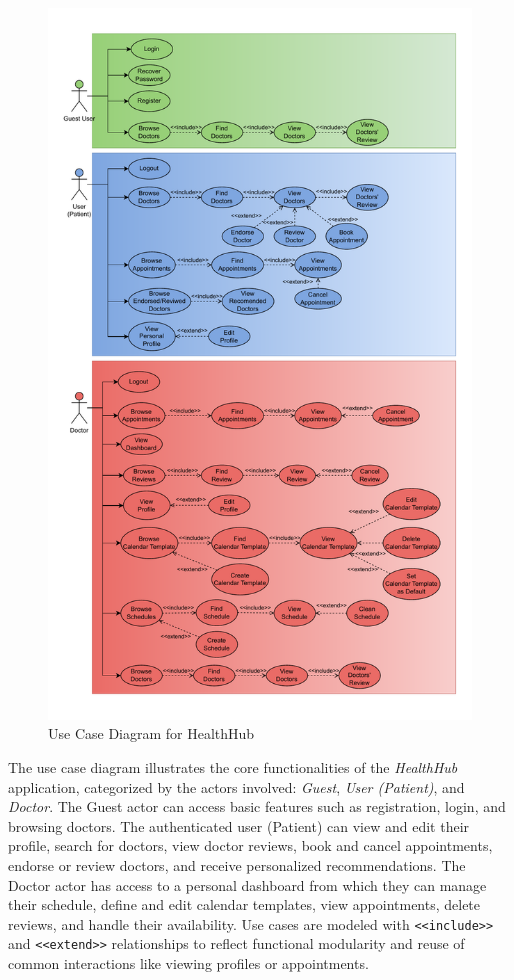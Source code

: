 \begin{figure}[!h]
    \centering
	\includegraphics[scale=0.60]{./resources/healthhub_use_case.pdf}
    \caption{Use Case Diagram for HealthHub}
    \label{fig:use-case-diagram}
\end{figure}

The use case diagram illustrates the core functionalities of the \textit{HealthHub} application, categorized by the actors involved: \textit{Guest}, \textit{User (Patient)}, and \textit{Doctor}. The Guest actor can access basic features such as registration, login, and browsing doctors. The authenticated user (Patient) can view and edit their profile, search for doctors, view doctor reviews, book and cancel appointments, endorse or review doctors, and receive personalized recommendations. The Doctor actor has access to a personal dashboard from which they can manage their schedule, define and edit calendar templates, view appointments, delete reviews, and handle their availability. Use cases are modeled with \texttt{<<include>>} and \texttt{<<extend>>} relationships to reflect functional modularity and reuse of common interactions like viewing profiles or appointments.


